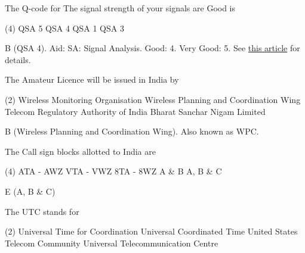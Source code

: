\documentclass[a4paper]{article}
\begin{document}
\begin{question}The Q-code for \apostrophe{}The signal strength of your signals are Good\apostrophe{} is \spaces
	\begin{tasks}(4)
		\task QSA 5
		\task QSA 4
		\task QSA 1
		\task QSA 3
	\end{tasks}
\end{question}

\begin{solution}
	B (QSA 4). Aid: SA: Signal Analysis. Good: 4. Very Good: 5. See \href{https://en.wikipedia.org/wiki/QSA_and_QRK_radio_signal_reports}{this article} for details.
\end{solution}

\vspace{5mm}



\begin{question}The Amateur Licence will be issued in India by \spaces
	\begin{tasks}(2)
		\task Wireless Monitoring Organisation
		\task Wireless Planning and Coordination Wing
		\task Telecom Regulatory Authority of India
		\task Bharat Sanchar Nigam Limited
	\end{tasks}
\end{question}

\begin{solution}
	B (Wireless Planning and Coordination Wing). Also known as WPC.
\end{solution}

\vspace{5mm}



\begin{question}The Call sign blocks allotted to India are \spaces
	\begin{tasks}(4)
		\task ATA - AWZ
		\task VTA - VWZ
		\task 8TA - 8WZ
		\task A \& B
		\task A, B \& C
	\end{tasks}
\end{question}

\begin{solution}
	E (A, B \& C)
\end{solution}

\vspace{5mm}
\begin{question}The UTC stands for \spaces
	\begin{tasks}(2)
		\task Universal Time for Coordination
		\task Universal Coordinated Time
		\task United States Telecom Community
		\task Universal Telecommunication Centre
	\end{tasks}
\end{question}
\end{document}
